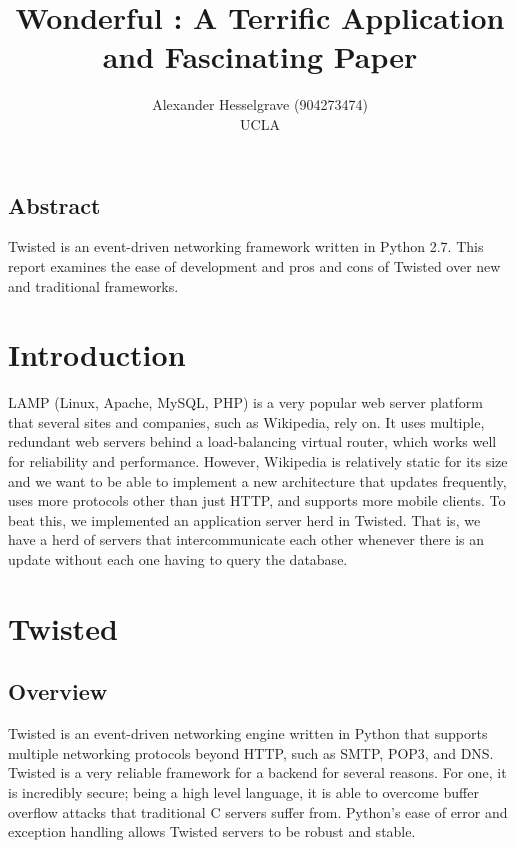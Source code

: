 \documentclass[letterpaper,twocolumn,10pt]{article}
\begin{document}
\date{}

\title{\Large \bf Wonderful : A Terrific Application and Fascinating Paper}

\author{
{\rm Alexander Hesselgrave (904273474)}\\
UCLA
\and
} %

\maketitle

\thispagestyle{empty}


\subsection*{Abstract}
Twisted is an event-driven networking framework written in Python 2.7. This report examines the ease of development and pros and cons of Twisted over new and traditional frameworks.

\section{Introduction}
LAMP (Linux, Apache, MySQL, PHP) is a very popular web server platform that several sites and companies, such as Wikipedia, rely on. It uses multiple, redundant web servers behind a load-balancing virtual router, which works well for reliability and performance. However, Wikipedia is relatively static for its size and we want to be able to implement a new architecture that updates frequently, uses more protocols other than just HTTP, and supports more mobile clients. To beat this, we implemented an application server herd in Twisted. That is, we have a herd of servers that intercommunicate each other whenever there is an update without each one having to query the database.

\section{Twisted}
\subsection{Overview}
Twisted is an event-driven networking engine written in Python that supports multiple networking protocols beyond HTTP, such as SMTP, POP3, and DNS. Twisted is a very reliable framework for a backend for several reasons. For one, it is incredibly secure; being a high level language, it is able to overcome buffer overflow attacks that traditional C servers suffer from. Python's ease of error and exception handling allows Twisted servers to be robust and stable. 
\end{document}

